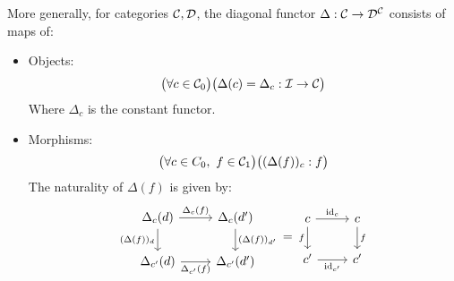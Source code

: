 \begin{definition}
  More generally, for categories $\mathcal{C}, \mathcal{D}$, the diagonal functor $\Delta: \mathcal{C} \to
  \mathcal{D}^{\mathcal{C}}$ consists of maps of: \parencite{leinster:basic_category_theory}
  \begin{itemize}
    \item Objects:
      \[\big(\forall c\in \mathcal{C}_0\big)
        \big(\Delta(c) = \Delta_c : \mathcal{I} \to \mathcal{C}\big)\]
      Where $\Delta_c$ is the constant functor.
    \item Morphisms:
      \[\big(\forall c\in C_0,\ f\in \mathcal{C}_1\big)
        \big((\Delta(f))_c: f \big)\]
      The naturality of $\Delta(f)$ is given by:
      \[\begin{tikzcd}[ampersand replacement=\&]
        {\Delta_c(d)} \& {\Delta_c(d')} \\
        {\Delta_{c'}(d)} \& {\Delta_{c'}(d')}
        \arrow["{\Delta_c(f)}", from=1-1, to=1-2]
        \arrow["{(\Delta(f))_d}"', from=1-1, to=2-1]
        \arrow["{\Delta_{c'}(f)}"', from=2-1, to=2-2]
        \arrow["{(\Delta(f))_{d'}}", from=1-2, to=2-2]
      \end{tikzcd}
      =
      \begin{tikzcd}[ampersand replacement=\&]
        c \& c \\
        {c'} \& {c'}
        \arrow["{\id_c}", from=1-1, to=1-2]
        \arrow["f"', from=1-1, to=2-1]
        \arrow["{\id_{c'}}"', from=2-1, to=2-2]
        \arrow["f", from=1-2, to=2-2]
      \end{tikzcd}\]
  \end{itemize}
\end{definition}